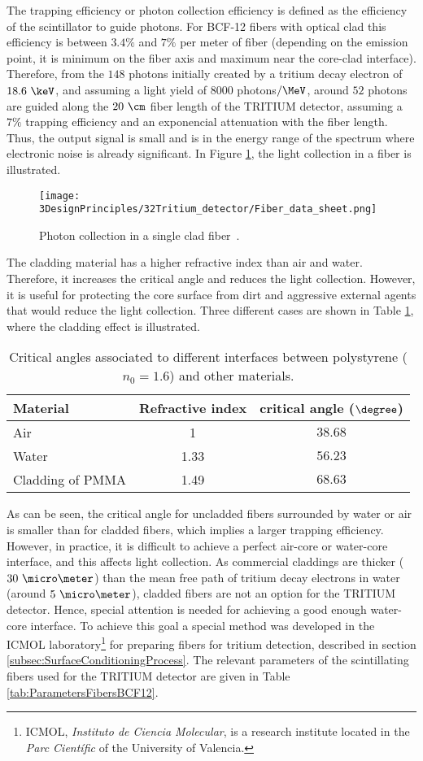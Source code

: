 The trapping efficiency or photon collection efficiency is defined as the efficiency of the scintillator to guide photons. For BCF-12 fibers with optical clad this efficiency is between $3.4\%$ and $7\%$ per meter of fiber (depending on the emission point, it is minimum on the fiber axis and maximum near the core-clad interface). Therefore, from the $148$ photons initially created by a tritium decay electron of $18.6~\keV$, and assuming a light yield of $8000$ photons$/\MeV$, around $52$ photons are guided along the $20~\cm$ fiber length of the TRITIUM detector, assuming a $7\%$ trapping efficiency and an exponencial attenuation with the fiber length. Thus, the output signal is small and is in the energy range of the spectrum where electronic noise is already significant. In Figure \ref{fig:Fiber_physic}, the light collection in a fiber is illustrated.

\begin{figure}[htbp]
\centering
\texttt{[image: 3DesignPrinciples/32Tritium\_detector/Fiber\_data\_sheet.png]}
\caption{Photon collection in a single clad fiber\label{fig:Fiber_physic}~\cite{DataSheetBCF12Fiber}.}
\end{figure}
The cladding material has a higher refractive index than air and water. Therefore, it increases the critical angle and reduces the light collection. However, it is useful for protecting the core surface from dirt and aggressive external agents that would reduce the light collection. Three different cases are shown in Table \ref{tab:CriticalAngles}, where the cladding effect is illustrated.
\begin{table}[htbp]
\centering{}%
\begin{tabular}{lcc}
\toprule 
Material & Refractive index & critical angle ($\degree$) \tabularnewline
\midrule
\midrule 
Air & 1 & $38.68$ \tabularnewline
Water & 1.33 & $56.23$ \tabularnewline
Cladding of PMMA & 1.49 & $68.63$ \tabularnewline
\bottomrule
\end{tabular}
\caption{Critical angles associated to different interfaces between polystyrene ($n_0=1.6$) and other materials.}
\label{tab:CriticalAngles}
\end{table}
As can be seen, the critical angle for uncladded fibers surrounded by water or air is smaller than for cladded fibers, which implies a larger trapping efficiency. However, in practice, it is difficult to achieve a perfect air-core or water-core interface, and this affects light collection. As commercial claddings are thicker ($30~\micro \meter$) than the mean free path of tritium decay electrons in water (around $5~\micro\meter$), cladded fibers are not an option for the TRITIUM detector. Hence, special attention is needed for achieving a good enough water-core interface. To achieve this goal a special method was developed in the ICMOL laboratory\footnote{ICMOL, \textit{Instituto de Ciencia Molecular}, is a research institute located in the \textit{Parc Científic} of the University of Valencia.} for preparing fibers for tritium detection, described in section \ref{subsec:SurfaceConditioningProcess}. The relevant parameters of the scintillating fibers used for the TRITIUM detector are given in Table \ref{tab:ParametersFibersBCF12}.

